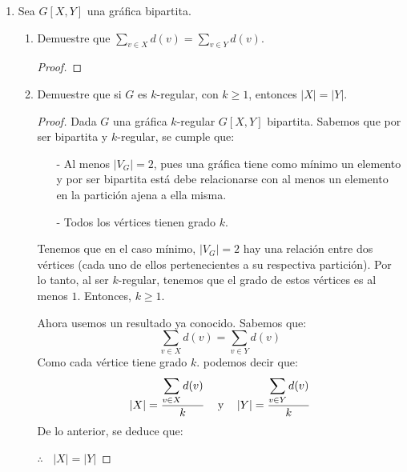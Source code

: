 \documentclass{article}
\begin{document}
\begin{enumerate}
\begin{enumerate}
\begin{proof}
        \hspace*{3cm}  $\therefore$ \ \ \ $BL_n$ es bipartita en $X$ y $Y$, \textit{i.e.} $BL_n[X,Y]$
      \end{proof}
    \end{enumerate}
    
  \item Sea $G[X, Y]$ una gr\'afica bipartita.
    \begin{enumerate}
      \item Demuestre que $\sum_{v \in X} d(v) = \sum_{v \in Y} d(v)$.
        \begin{proof}
          
        \end{proof}
        
      \item Demuestre que si $G$ es $k$-regular, con $k \ge 1$, entonces
        $|X| = |Y|$.
        \begin{proof}
          Dada $G$ una gráfica $k$-regular $G[X,Y]$ bipartita. 
          Sabemos que por ser bipartita y $k$-regular, se cumple que:
          \begin{itemize}
          \item[-] Al menos $|V_G|=2$, pues una gráfica tiene como mínimo
            un elemento y por ser bipartita está debe relacionarse con al
            menos un elemento en la partición ajena a ella misma. 
            
          \item[-] Todos los vértices tienen grado $k$.
          \end{itemize}
          Tenemos que en el caso mínimo, $|V_G| = 2$  hay una relación entre
          dos vértices (cada uno de ellos pertenecientes a su respectiva
          partición). Por lo tanto, al ser $k$-regular, tenemos que el grado
          de estos vértices es al menos $1$. Entonces, $k \geq 1$.
          
          Ahora usemos un resultado ya conocido. Sabemos que:
          \[
          \sum_{v \in X} d(v) = \sum_{v \in Y} d(v)
          \]
          Como cada vértice tiene grado $k$. podemos decir que:
          \[
          \abs{X} = \frac{\displaystyle \sum_{v \in X} d(v)}{k} \text{\hspace{0.3cm}
            y \hspace{0.3cm}} \abs{Y} = \frac{\displaystyle \sum_{v \in Y} d(v)}{k}
          \]
          De lo anterior, se deduce que:

          \hspace*{5.6cm} $\therefore\ \ \ \ |X| = |Y|$
        \end{proof}
    \end{enumerate}
    
\end{enumerate}
\end{document}
